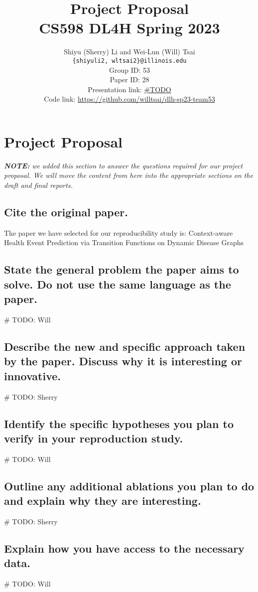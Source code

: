 \documentclass[11pt,a4paper]{article}
\title{
  Project Proposal \\
  CS598 DL4H Spring 2023
  }
\author{Shiyu (Sherry) Li and Wei-Lun (Will) Tsai \\
  \texttt{\{shiyuli2, wltsai2\}@illinois.edu}
  \\[2em]
  Group ID: 53\\
  Paper ID: 28\\
  Presentation link: \url{\#TODO} \\
  Code link: \url{https://github.com/willtsai/dlh-sp23-team53}}
\begin{document}
\maketitle


\section{Project Proposal}
\textit {\textbf {NOTE:} we added this section to answer the questions required for our project proposal. 
We will move the content from here into the appropriate sections on the draft and final reports.}

\subsection{Cite the original paper.}
The paper we have selected for our reproducibility study is: 
Context-aware Health Event Prediction via Transition Functions on Dynamic Disease Graphs \cite{chet} 

\subsection{State the general problem the paper aims to solve. Do not
use the same language as the paper.}
\# TODO: Will

\subsection{Describe the new and specific approach taken by the
paper. Discuss why it is interesting or innovative.}
\# TODO: Sherry

\subsection{Identify the specific hypotheses you plan to verify in your
reproduction study.}
\# TODO: Will

\subsection{Outline any additional ablations you plan to do and
explain why they are interesting.}
\# TODO: Sherry

\subsection{Explain how you have access to the necessary data.}
\# TODO: Will
\end{document}
